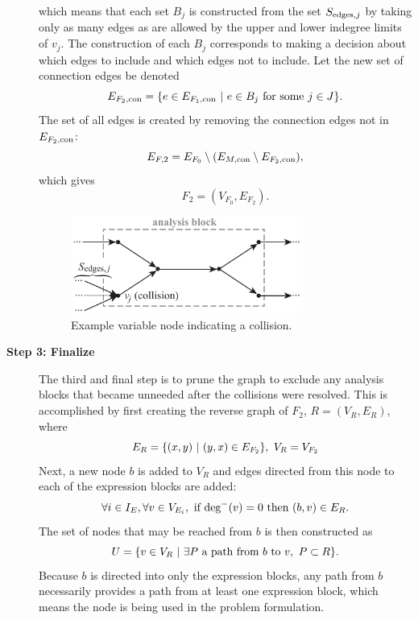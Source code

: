 \begin{description}
        which means that each set $B_j$ is constructed from the set $S_{\textrm{edges},j}$ by taking only as many edges as are allowed by the upper and lower indegree limits of $v_j$.  
The construction of each $B_j$ corresponds to making a decision about which edges to include and which edges not to include. 
Let the new set of connection edges be denoted
    \begin{equation}
    E_{F_2,\textrm{con}} = \{ e \in E_{F_1,\textrm{con}} \ | \  e \in B_j \textrm{ for some } j \in J\}.
    \end{equation}
The set of all edges is created by removing the connection edges not in $E_{F_2,\textrm{con}}$:
    \begin{equation}
    E_{F,2} = E_{F_0} \setminus (E_{M,\textrm{con}} \setminus E_{F_2,\textrm{con}}),
    \end{equation}
    which gives
    \begin{equation}
    F_2 = (V_{F_0},E_{F_2}).
    \end{equation}
    \begin{figure}[htb!]
        \begin{center}
        \includegraphics[width=3in]{images/analysis_block_collision}
        \end{center}
        \vspace{-20pt}
    \caption{Example variable node indicating a collision.}
    \label{f:collision}
    \end{figure}

    \item[\bf{Step 3: Finalize}] 
        The third and final step is to prune the graph to exclude any analysis blocks that became unneeded after the collisions were resolved.
        This is accomplished by first creating the reverse graph of $F_2$, $R = (V_R,E_R)$, where
	\begin{equation}
	E_R = \{ (x,y) \ | \  (y,x) \in E_{F_2}\}, \ V_R = V_{F_2}
	\end{equation}
	Next, a new node $b$ is added to $V_R$ and edges directed from this node to each of the expression blocks are added:
    \begin{equation}
        \forall i \in I_E,\forall v \in V_{E_i}, \textrm{ if } \textrm{deg}^-(v)=0 \textrm{ then } (b,v) \in E_R.
    \end{equation}
        The set of nodes that may be reached from $b$ is then constructed as
    \begin{equation}
        U = \{ v \in V_R \ | \  \exists P \textrm{ a path from $b$ to $v$}, \ P \subset R \}.
        \end{equation}
	Because $b$ is directed into only the expression blocks, any path from $b$ necessarily provides a path from at least one expression block, which means the node is being used in the problem formulation.


\end{description}
